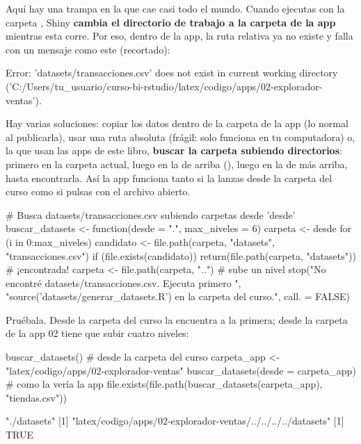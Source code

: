 Aquí hay una trampa en la que cae casi todo el mundo. Cuando ejecutas  con la carpeta
, Shiny
\textbf{cambia el directorio de trabajo a la carpeta de la app} mientras
esta corre. Por eso, dentro de la app, la ruta relativa
 ya no existe y 
falla con un mensaje como este (recortado):

\begin{textocodigo}
Error: 'datasets/transacciones.csv' does not exist in current working
directory ('C:/Users/tu_usuario/curso-bi-rstudio/latex/codigo/apps/02-explorador-ventas').
\end{textocodigo}

Hay varias soluciones: copiar los datos dentro de la carpeta de la app (lo
normal al publicarla), usar una ruta absoluta (frágil: solo funciona en tu
computadora) o, la que usan las apps de este libro, \textbf{buscar la carpeta
 subiendo directorios}: primero en la carpeta actual,
luego en la de arriba (), luego en la de más arriba, hasta
encontrarla. Así la app funciona tanto si la lanzas desde la carpeta del
curso como si pulsas  con el archivo abierto.

\begin{rcode}
# Busca datasets/transacciones.csv subiendo carpetas desde 'desde'
buscar_datasets <- function(desde = ".", max_niveles = 6) {
  carpeta <- desde
  for (i in 0:max_niveles) {
    candidato <- file.path(carpeta, "datasets", "transacciones.csv")
    if (file.exists(candidato)) {
      return(file.path(carpeta, "datasets"))   # ¡encontrada!
    }
    carpeta <- file.path(carpeta, "..")        # sube un nivel
  }
  stop("No encontré datasets/transacciones.csv. Ejecuta primero ",
       "source('datasets/generar_datasets.R') en la carpeta del curso.",
       call. = FALSE)
}
\end{rcode}

Pruébala. Desde la carpeta del curso la encuentra a la primera; desde la
carpeta de la app 02 tiene que subir cuatro niveles:

\begin{rcode}
buscar_datasets()                    # desde la carpeta del curso
carpeta_app <- "latex/codigo/apps/02-explorador-ventas"
buscar_datasets(desde = carpeta_app) # como la vería la app
file.exists(file.path(buscar_datasets(carpeta_app), "tiendas.csv"))
\end{rcode}
\begin{rsalida}
[1] "./datasets"
[1] "latex/codigo/apps/02-explorador-ventas/../../../../datasets"
[1] TRUE
\end{rsalida}

